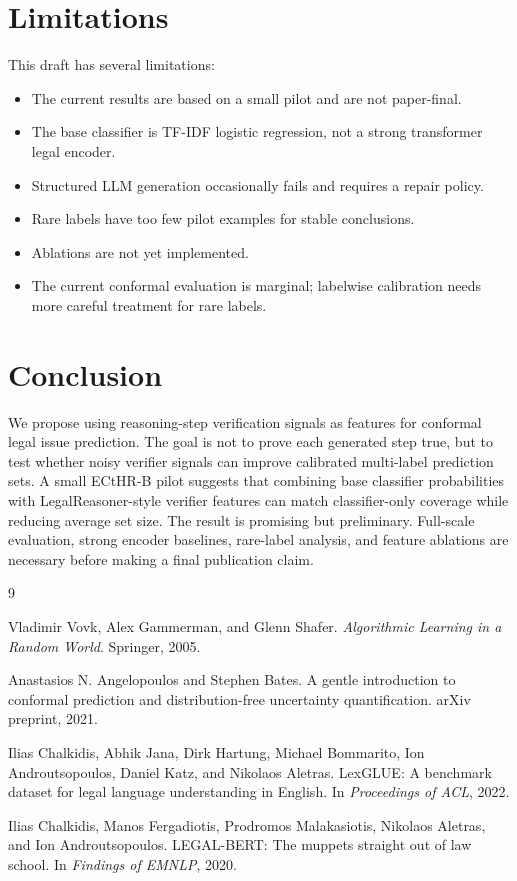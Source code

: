 \documentclass[11pt]{article}
\begin{document}
\section{Limitations}

This draft has several limitations:
\begin{itemize}
  \item The current results are based on a small pilot and are not paper-final.
  \item The base classifier is TF-IDF logistic regression, not a strong transformer legal encoder.
  \item Structured LLM generation occasionally fails and requires a repair policy.
  \item Rare labels have too few pilot examples for stable conclusions.
  \item Ablations are not yet implemented.
  \item The current conformal evaluation is marginal; labelwise calibration needs more careful treatment for rare labels.
\end{itemize}

\section{Conclusion}

We propose using reasoning-step verification signals as features for conformal legal issue prediction. The goal is not to prove each generated step true, but to test whether noisy verifier signals can improve calibrated multi-label prediction sets. A small ECtHR-B pilot suggests that combining base classifier probabilities with LegalReasoner-style verifier features can match classifier-only coverage while reducing average set size. The result is promising but preliminary. Full-scale evaluation, strong encoder baselines, rare-label analysis, and feature ablations are necessary before making a final publication claim.

\begin{thebibliography}{9}

Vladimir Vovk, Alex Gammerman, and Glenn Shafer.
\newblock \emph{Algorithmic Learning in a Random World}.
\newblock Springer, 2005.

Anastasios N. Angelopoulos and Stephen Bates.
\newblock A gentle introduction to conformal prediction and distribution-free uncertainty quantification.
\newblock arXiv preprint, 2021.

Ilias Chalkidis, Abhik Jana, Dirk Hartung, Michael Bommarito, Ion Androutsopoulos, Daniel Katz, and Nikolaos Aletras.
\newblock LexGLUE: A benchmark dataset for legal language understanding in English.
\newblock In \emph{Proceedings of ACL}, 2022.

Ilias Chalkidis, Manos Fergadiotis, Prodromos Malakasiotis, Nikolaos Aletras, and Ion Androutsopoulos.
\newblock LEGAL-BERT: The muppets straight out of law school.
\newblock In \emph{Findings of EMNLP}, 2020.

\end{thebibliography}
\end{document}
